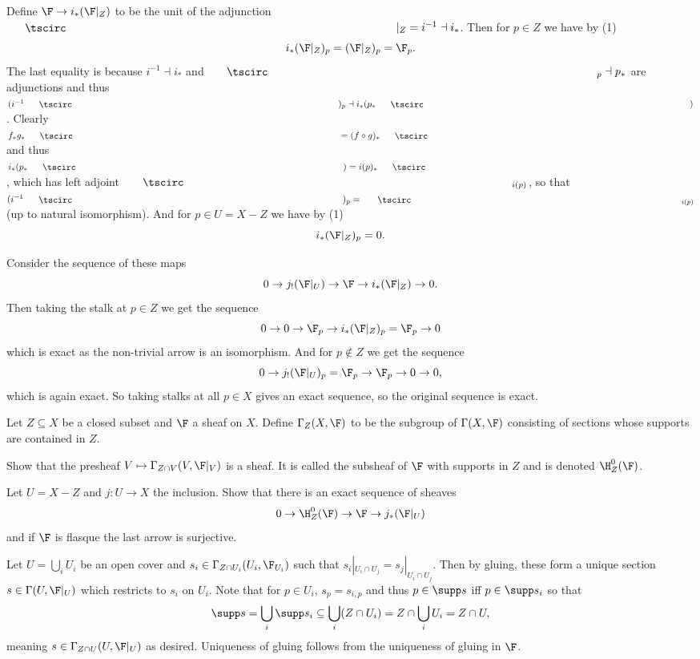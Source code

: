     Define $\F\to i_*(\F|_Z)$ to be the unit of the adjunction $\bul|_Z=i^{-1}\dashv i_*$.
    Then for $p\in Z$ we have by (1)
    $$ i_*(\F|_Z)_p = (\F|_Z)_p = \F_p . $$
    The last equality is because $i^{-1}\dashv i_*$ and $\bul_p\dashv p_*$ are adjunctions and thus $(i^{-1}\bul)_p\dashv i_*(p_*\bul)$.
    Clearly $f_*g_*\bul=(f\circ g)_*\bul$ and thus $i_*(p_*\bul)=i(p)_*\bul$, which has left adjoint $\bul_{i(p)}$, so that $(i^{-1}\bul)_p=\bul_{i(p)}$ (up to natural isomorphism).
    And for $p\in U=X-Z$ we have by (1)
    $$ i_*(\F|_Z)_p = 0 . $$

    Consider the sequence of these maps
    $$ 0 \to j_!(\F|_U) \to \F \to i_*(\F|_Z) \to 0 . $$
    Then taking the stalk at $p\in Z$ we get the sequence
    $$ 0 \to 0 \to \F_p \to i_*(\F|_Z)_p = \F_p \to 0 $$
    which is exact as the non-trivial arrow is an isomorphism.
    And for $p\notin Z$ we get the sequence
    $$ 0 \to j_!(\F|_U)_p = \F_p \to \F_p \to 0 \to 0 , $$
    which is again exact.
    So taking stalks at all $p\in X$ gives an exact sequence, so the original sequence is exact.
\eenum

\bprob[title={Hartshorne II.1.20}]

    Let $Z\subseteq X$ be a closed subset and $\F$ a sheaf on $X$.
    Define $\Gamma_Z(X,\F)$ to be the subgroup of $\Gamma(X,\F)$ consisting of sections whose supports are contained in $Z$.
    \benum
        \item Show that the presheaf $V\mapsto\Gamma_{Z\cap V}(V,\F|_V)$ is a sheaf.
        It is called the {\emphcolor subsheaf of $\F$ with supports in $Z$} and is denoted $\H^0_Z(\F)$.
        \item Let $U=X-Z$ and $j\colon U\to X$ the inclusion.
        Show that there is an exact sequence of sheaves
        $$ 0 \to \H^0_Z(\F) \to \F \to j_*(\F|_U) $$
        and if $\F$ is flasque the last arrow is surjective.
    \eenum

\eprob

\benum
    \item Let $U=\bigcup_iU_i$ be an open cover and $s_i\in\Gamma_{Z\cap U_i}(U_i,\F_{U_i})$ such that $s_i|_{U_i\cap U_j}=s_j|_{U_i\cap U_j}$.
    Then by gluing, these form a unique section $s\in\Gamma(U,\F|_U)$ which restricts to $s_i$ on $U_i$.
    Note that for $p\in U_i$, $s_p=s_{i,p}$ and thus $p\in\supp s$ iff $p\in\supp s_i$ so that
    $$ \supp s = \bigcup_i\supp s_i \subseteq \bigcup_i(Z\cap U_i) = Z\cap\bigcup_iU_i = Z\cap U , $$
    meaning $s\in\Gamma_{Z\cap U}(U,\F|_U)$ as desired.
    Uniqueness of gluing follows from the uniqueness of gluing in $\F$.

